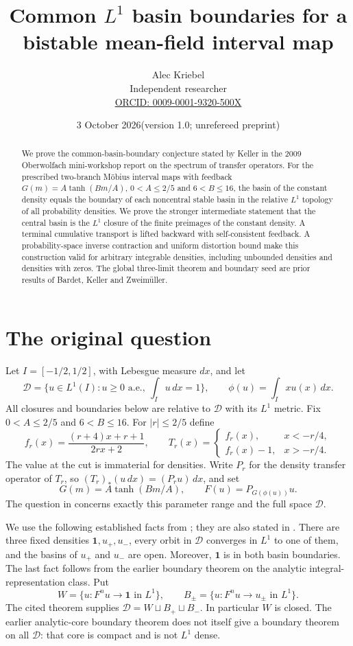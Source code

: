\documentclass[11pt]{article}
\title{Common $L^1$ basin boundaries for a bistable mean-field interval map}
\author{Alec Kriebel\\\small Independent researcher\\
\small\href{https://orcid.org/0009-0001-9320-500X}{ORCID: 0009-0001-9320-500X}}
\date{3 October 2026\quad (version 1.0; unrefereed preprint)}
\newcommand{\D}{\mathcal D}
\newcommand{\one}{\mathbf 1}
\begin{document}
\maketitle
\begin{abstract}
We prove the common-basin-boundary conjecture stated by Keller in the 2009
Oberwolfach mini-workshop report on the spectrum of transfer operators. For the prescribed
two-branch M\"obius interval maps with feedback
$G(m)=A\tanh(Bm/A)$, $0<A\le2/5$ and $6<B\le16$, the basin of the constant
density equals the boundary of each noncentral stable basin in the relative
$L^1$ topology of all probability densities. We prove the stronger intermediate
statement that the central basin is the $L^1$ closure of the finite preimages
of the constant density. A terminal cumulative transport is lifted backward
with self-consistent feedback. A probability-space inverse contraction and
uniform distortion bound make this construction valid for arbitrary
integrable densities, including unbounded densities and densities with zeros.
The global three-limit theorem and boundary seed are prior results of
Bardet, Keller and Zweim\"uller.
\end{abstract}

\section{The original question}
Let $I=[-1/2,1/2]$, with Lebesgue measure $dx$, and let
\[
 \D=\{u\in L^1(I):u\ge0\text{ a.e.},\ \int_Iu\,dx=1\},
 \qquad \phi(u)=\int_I xu(x)\,dx.
\]
All closures and boundaries below are relative to $\D$ with its $L^1$ metric.
Fix $0<A\le2/5$ and $6<B\le16$. For $|r|\le2/5$ define
\[
 f_r(x)=\frac{(r+4)x+r+1}{2rx+2},\qquad
 T_r(x)=\begin{cases}f_r(x),&x<-r/4,\\ f_r(x)-1,&x>-r/4.\end{cases}
\]
The value at the cut is immaterial for densities. Write $P_r$ for the density
transfer operator of $T_r$, so $(T_r)_*(u\,dx)=(P_ru)\,dx$, and set
\[
 G(m)=A\tanh(Bm/A),\qquad F(u)=P_{G(\phi(u))}u.
\]
The question in \cite[pp.~2713--2715, especially p.~2715]{OWR} concerns exactly
this parameter range and the full space $\D$.

We use the following established facts from
\cite[Theorem~2, Propositions~3 and~4]{BKZ}; they are also stated in
\cite[Theorem~2 and the discussion following it]{OWR}.
There are three fixed densities $\one,u_+,u_-$, every orbit in $\D$ converges
in $L^1$ to one of them, and the basins of $u_+$ and $u_-$ are open. Moreover,
$\one$ is in both basin boundaries. The last fact follows from the earlier
boundary theorem on the analytic integral-representation class. Put
\[
 W=\{u:F^nu\longrightarrow\one\text{ in }L^1\},\qquad
 B_\pm=\{u:F^nu\longrightarrow u_\pm\text{ in }L^1\}.
\]
The cited theorem supplies $\D=W\sqcup B_+\sqcup B_-$. In particular $W$ is
closed. The earlier analytic-core boundary theorem does not itself give a
boundary theorem on all $\D$: that core is compact and is not $L^1$ dense.
\end{document}
